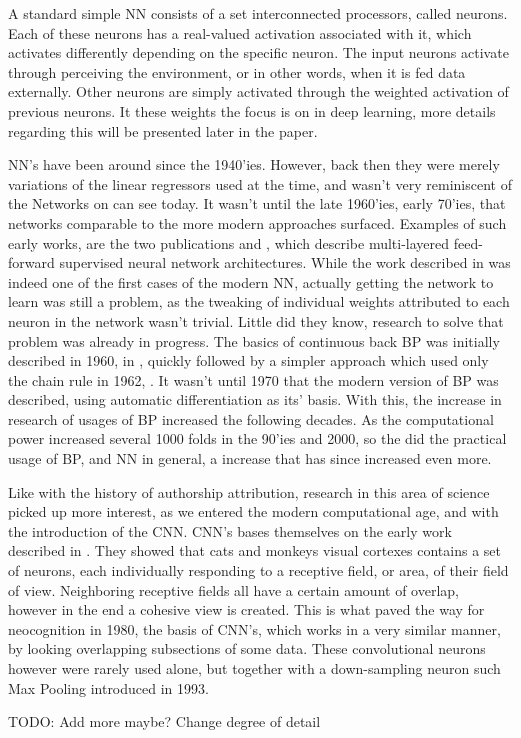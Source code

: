 A standard simple \gls{NN} consists of a set interconnected processors, called
neurons. Each of these neurons has a real-valued activation associated with
it, which activates differently depending on the specific neuron. The input
neurons activate through perceiving the environment, or in other words, when
it is fed data externally. Other neurons are simply activated through the
weighted activation of previous neurons. It these weights the focus is on in
deep learning, more details regarding this will be presented later in the
paper.\cite{DBLP:journals/corr/Schmidhuber14}

\gls{NN}'s have been around since the 1940'ies. However, back then they were
merely variations of the linear regressors used at the time, and wasn't
very reminiscent of the Networks on can see today. It wasn't until the
late 1960'ies, early 70'ies, that networks comparable to the more modern
approaches surfaced. Examples of such early works, are the two publications
\cite{ivakhnenko1973cybernetic} and \cite{4308320}, which describe multi-layered
feed-forward supervised neural network architectures. While the work described
in \cite{4308320} was indeed one of the first cases of the modern \gls{NN},
actually getting the network to learn was still a problem, as the tweaking of
individual weights attributed to each neuron in the network wasn't trivial.
Little did they know, research to solve that problem was already in progress.
The basics of continuous back \gls{BP} was initially described in 1960, in
\cite{Kelley1960}, quickly followed by a simpler approach which used only the
chain rule in 1962, \cite{DREYFUS196230}. It wasn't until 1970 that the modern
version of \gls{BP} was described, using automatic differentiation as its'
basis. With this, the increase in research of usages of \gls{BP} increased the
following decades. As the computational power increased several 1000 folds in
the 90'ies and 2000, so the did the practical usage of \gls{BP}, and \gls{NN} in
general, a increase that has since increased even more. \cite{Schmidhuber:2015}

Like with the history of authorship attribution, research in this area of
science picked up more interest, as we entered the modern computational age,
and with the introduction of the \gls{CNN}. \gls{CNN}'s bases themselves on
the early work described in \cite{TJP:TJP19681951215}. They showed that cats
and monkeys visual cortexes contains a set of neurons, each individually
responding to a receptive field, or area, of their field of view. Neighboring
receptive fields all have a certain amount of overlap, however in the end
a cohesive view is created. This is what paved the way for neocognition
in 1980\cite{Fukushima1980}, the basis of \gls{CNN}'s, which works in a
very similar manner, by looking overlapping subsections of some data. These
convolutional neurons however were rarely used alone, but together with a
down-sampling neuron such Max Pooling introduced in 1993.\cite{Schmidhuber:2015}

TODO: Add more maybe? Change degree of detail



